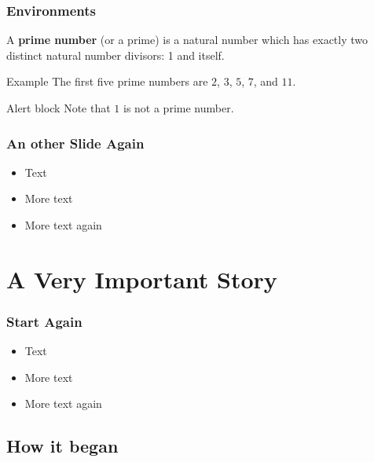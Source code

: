
\begin{frame}
\frametitle{Environments}
  \begin{definition}
    A \textbf{prime number} (or a prime) is a natural number which has exactly two distinct natural number divisors: 1 and itself. 
  \end{definition}

  \begin{exampleblock}{Example}
    The first five prime numbers are $2$, $3$, $5$, $7$, and $11$.
  \end{exampleblock}

  \begin{alertblock}{Alert block}
    Note that $1$ is not a prime number.
  \end{alertblock}
\end{frame}


\begin{frame} 
\frametitle{An other Slide Again}
  \begin{itemize}
  \item Text
  \item More text
  \item More text again
  \end{itemize}
\end{frame}

\section{A Very Important Story}

\begin{frame} 
\frametitle{Start Again}
  \begin{itemize}
  \item Text
  \item More text
  \item More text again
  \end{itemize}
\end{frame}

\subsection{How it began}

